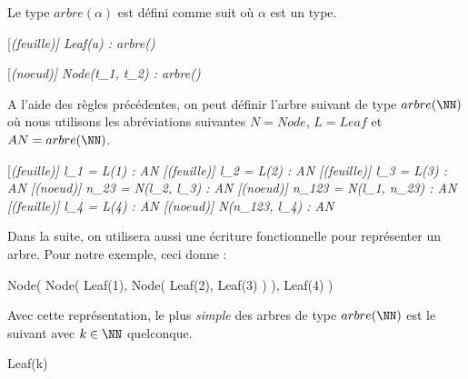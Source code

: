 \begin{definition} \label{basic-type}
	Le type $arbre(\alpha)$ est défini comme suit où $\alpha$ est un type.

	\medskip

	\begin{center}
	\begin{prooftree}
	    [\footnotesize\itshape (feuille)]{%
	    	Leaf(a) : arbre(\alpha)%
		}
	\end{prooftree}
	\quad\quad\quad
	\begin{prooftree}
    	\hypo{t_1 : arbre(\alpha)}
	    \hypo{t_2 : arbre(\alpha)}
    	[\footnotesize\itshape (noeud)]{%
	    	Node(t_1, t_2) : arbre(\alpha)%
		}
	\end{prooftree}
	\end{center}
\end{definition}


\begin{example} \label{exa-tree}
	A l'aide des règles précédentes, on peut définir l'arbre suivant de type $arbre(\NN)$ où nous utilisons les abréviations suivantes $N = Node$, $L = Leaf$ et $AN = arbre(\NN)$.
	
	\medskip
	\scriptsize
	
	\begin{center}
	\begin{prooftree}
	    \hypo{1 : \NN}
	    [\footnotesize\itshape (feuille)]{%
	    	l_1 = L(1) : AN%
		}
	    \hypo{2 : \NN}
	    [\footnotesize\itshape (feuille)]{%
	    	l_2 = L(2) : AN%
		}
	    \hypo{3 : \NN}
	    [\footnotesize\itshape (feuille)]{%
	    	l_3 = L(3) : AN%
		}
    	[\footnotesize\itshape (noeud)]{%
	    	n_{23} = N(l_2, l_3) : AN%
		}
    	[\footnotesize\itshape (noeud)]{%
	    	n_{123} = N(l_1, n_{23}) : AN%
		}
		\hypo{4 : \NN}
	    [\footnotesize\itshape (feuille)]{%
	    	l_4 = L(4) : AN%
		}
    	[\footnotesize\itshape (noeud)]{%
	    	N(n_{123}, l_4) : AN%
		}
	\end{prooftree}
	\end{center}
	
	\medskip
	\normalsize
	
	Dans la suite, on utilisera aussi une écriture fonctionnelle pour représenter un arbre.
	Pour notre exemple, ceci donne :
	\begin{pseudocode}
Node(
	Node(
		Leaf(1),
		Node(
			Leaf(2),
			Leaf(3)
		)
	),
	Leaf(4)
)
	\end{pseudocode}
	
	\medskip

	Avec cette représentation, le plus \emph{\og simple \fg} des arbres de type $arbre(\NN)$ est le suivant avec $k \in \NN$ quelconque.
	\begin{pseudocode}
Leaf(k)
	\end{pseudocode}
\end{example}

